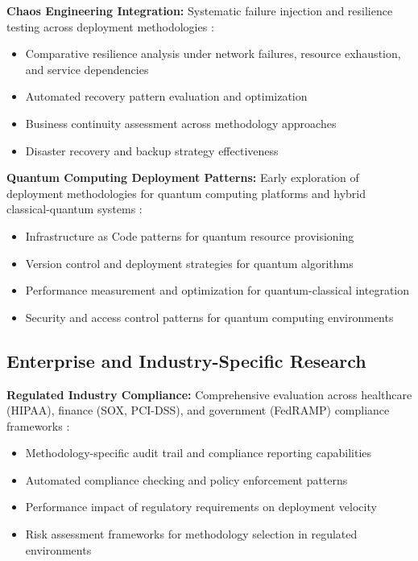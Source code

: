\textbf{Chaos Engineering Integration:} Systematic failure injection and resilience testing across deployment methodologies \cite{chaos_engineering,resilience_testing}:
\begin{itemize}
\item Comparative resilience analysis under network failures, resource exhaustion, and service dependencies
\item Automated recovery pattern evaluation and optimization
\item Business continuity assessment across methodology approaches
\item Disaster recovery and backup strategy effectiveness
\end{itemize}

\textbf{Quantum Computing Deployment Patterns:} Early exploration of deployment methodologies for quantum computing platforms and hybrid classical-quantum systems \cite{quantum_computing,hybrid_quantum_classical}:
\begin{itemize}
\item Infrastructure as Code patterns for quantum resource provisioning
\item Version control and deployment strategies for quantum algorithms
\item Performance measurement and optimization for quantum-classical integration
\item Security and access control patterns for quantum computing environments
\end{itemize}

\subsection{Enterprise and Industry-Specific Research}
\label{subsec:enterprise_research}

\textbf{Regulated Industry Compliance:} Comprehensive evaluation across healthcare (HIPAA), finance (SOX, PCI-DSS), and government (FedRAMP) compliance frameworks \cite{regulatory_compliance,industry_standards}:
\begin{itemize}
\item Methodology-specific audit trail and compliance reporting capabilities
\item Automated compliance checking and policy enforcement patterns
\item Performance impact of regulatory requirements on deployment velocity
\item Risk assessment frameworks for methodology selection in regulated environments
\end{itemize}

